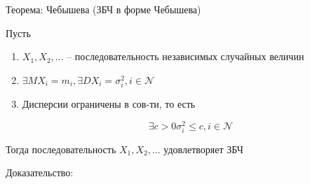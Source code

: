 Теорема: Чебышева (ЗБЧ в форме Чебышева)

Пусть

\begin{enumerate}
    \item $X_1,X_2,...$ -- последовательность независимых случайных величин
    \item $\exists MX_i = m_i, \exists DX_i = \sigma_i^2, i \in \mathcal N$
    \item Дисперсии ограничены в сов-ти, то есть

        \begin{equation*}
            \exists c > 0 \sigma_i^2 \le c, i \in \mathcal N
        \end{equation*}
\end{enumerate}

Тогда последовательность $X_1, X_2,...$ удовлетворяет ЗБЧ


Доказательство:

